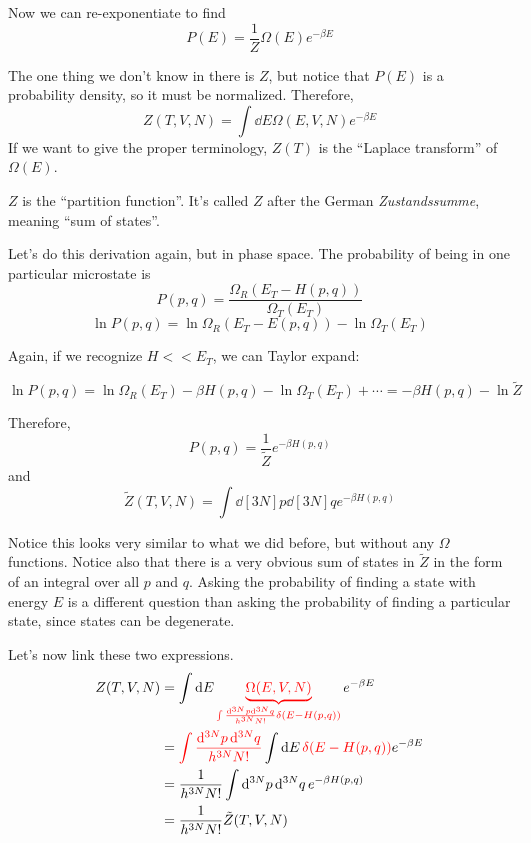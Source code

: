 \documentclass[a4paper,twoside,master.tex]{subfiles}
\begin{document}
Now we can re-exponentiate to find
\begin{equation}
    P(E) = \frac{1}{Z} \Omega(E) e^{- \beta E}
\end{equation}

The one thing we don't know in there is $ Z $, but notice that $ P(E) $ is a probability density, so it must be normalized. Therefore,
\begin{equation}
    Z(T, V, N) = \int \dd{E} \Omega(E, V, N) e^{- \beta E}
\end{equation}
If we want to give the proper terminology, $ Z(T) $ is the ``Laplace transform'' of $ \Omega(E) $.

$ Z $ is the ``partition function''. It's called $ Z $ after the German \textit{Zustandssumme}, meaning ``sum of states''.

Let's do this derivation again, but in phase space. The probability of being in one particular microstate is
\begin{equation}
    P(p,q) = \frac{\Omega_R(E_T - H(p,q))}{\Omega_T(E_T)}
\end{equation}
\begin{equation}
    \ln P(p,q) = \ln \Omega_R(E_T - E(p,q)) - \ln \Omega_T(E_T)
\end{equation}

Again, if we recognize $ H << E_T $, we can Taylor expand:

\begin{equation}
    \ln P(p,q) = \ln \Omega_R(E_T) - \beta H(p,q) - \ln \Omega_T(E_T) + \cdots = - \beta H(p,q) - \ln \tilde{Z}
\end{equation}

Therefore,
\begin{equation}
    P(p,q) = \frac{1}{\tilde{Z}} e^{- \beta H(p,q)} 
\end{equation}
and
\begin{equation}
    \tilde{Z}(T,V,N) = \int \dd[3N]{p} \dd[3N]{q} e^{- \beta H(p,q)}
\end{equation}

Notice this looks very similar to what we did before, but without any $ \Omega $ functions. Notice also that there is a very obvious sum of states in $ \tilde{Z} $ in the form of an integral over all $ p $ and $ q $. Asking the probability of finding a state with energy $ E $ is a different question than asking the probability of finding a particular state, since states can be degenerate.


Let's now link these two expressions.
\begin{align}
    Z(T,V,N) &= \int \dd{E} \color{red} \underbrace{\Omega(E,V,N)}_{ \int \frac{\dd[3N]{p} \dd[3N]{q}}{h^{3N} N!} \delta(E-H(p,q))} \color{black} e^{- \beta E} \\
    &= \color{red}\int \frac{\dd[3N]{p} \dd[3N]{q}}{h^{3N} N!}\color{black} \int \dd{E} \color{red}\delta(E - H(p,q))\color{black} e^{- \beta E} \\
    &= \frac{1}{h^{3N} N!} \int \dd[3N]{p} \dd[3N]{q} e^{- \beta H(p,q)} \\
    &= \frac{1}{h^{3N} N!} \tilde{Z}(T,V,N)
\end{align}
\end{document}
